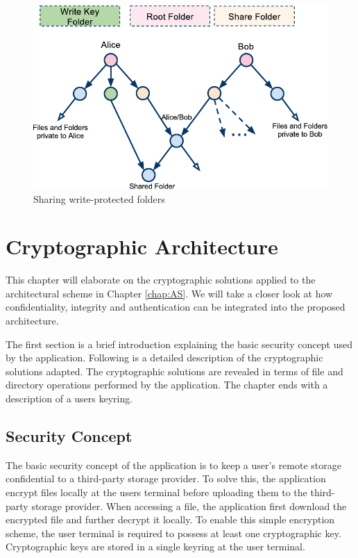 \documentclass[pdftex,english,10pt,b5paper,twoside]{book}
\begin{document}
\begin{figure}[h!]
    \centering
    \includegraphics[width=\columnwidth]{ArchitectureShareReadOnlyFolder.pdf}
    \caption{Sharing write-protected folders}
    \label{fig:AS:readonly}
\end{figure}

\chapter{Cryptographic Architecture}
\label{chap:CS}
This chapter will elaborate on the cryptographic solutions applied to the
architectural scheme in Chapter \ref{chap:AS}. We will take a closer look at
how confidentiality, integrity and authentication can be integrated into the
proposed architecture.


The first section is a brief introduction explaining the basic
security concept used by the application. Following is a detailed description of
the cryptographic solutions adapted. The cryptographic solutions are revealed
in terms of file and directory operations performed by the application. The
chapter ends with a description of a users keyring.

\section{Security Concept}

The basic security concept of the application is to keep a user's remote storage
confidential to a third-party storage provider. To solve this, the application
encrypt files locally at the users terminal before uploading them to the
third-party storage provider. When accessing a file, the application first
download the encrypted file and further decrypt it locally. To enable this
simple encryption scheme, the user terminal is required to possess at least one
cryptographic key. Cryptographic keys are stored in a single keyring at the user
terminal.
\end{document}
